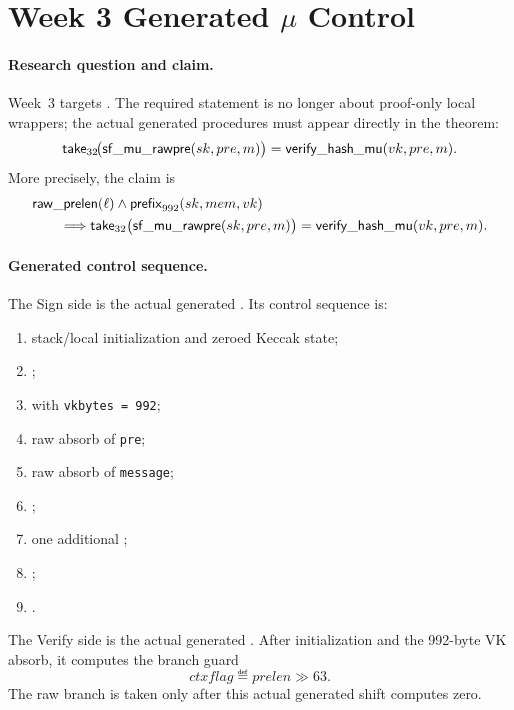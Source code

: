 \section{Week 3 Generated \texorpdfstring{$\mu$}{mu} Control}
\label{sec:week3-generated-mu}

\paragraph{Research question and claim.}
Week~3 targets . The required statement is no
longer about proof-only local wrappers; the actual generated procedures must
appear directly in the theorem:
\[
  \mathsf{take}_{32}\!\bigl(
    \mathsf{sf\_mu\_rawpre}(sk,pre,m)
  \bigr)
  =
  \mathsf{verify\_hash\_mu}(vk,pre,m).
\]
More precisely, the claim is
\[
\begin{aligned}
  &\mathsf{raw\_prelen}(\ell)\land \mathsf{prefix}_{992}(sk,mem,vk) \\
  &\qquad\Longrightarrow
  \mathsf{take}_{32}\bigl(\mathsf{sf\_mu\_rawpre}(sk,pre,m)\bigr)
  = \mathsf{verify\_hash\_mu}(vk,pre,m).
\end{aligned}
\]

\paragraph{Generated control sequence.}
The Sign side is the actual generated
. Its control sequence is:
\begin{enumerate}
  \item stack/local initialization and zeroed Keccak state;
  \item {};
  \item {} with \texttt{vkbytes = 992};
  \item raw absorb of \texttt{pre};
  \item raw absorb of \texttt{message};
  \item {};
  \item one additional ;
  \item {};
  \item {}.
\end{enumerate}
The Verify side is the actual generated
. After initialization and
the 992-byte VK absorb, it computes the branch guard
\[
  ctxflag \eqdef prelen \gg 63.
\]
The raw branch is taken only after this actual generated shift computes zero.

